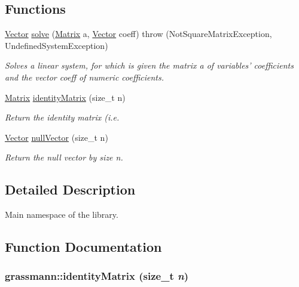 \subsection*{Functions}
\begin{CompactItemize}
\item 
\hyperlink{classgrassmann_1_1Vector}{Vector} \hyperlink{namespacegrassmann_bc7cc2e4f7133d5867c3eeb29c506f2b}{solve} (\hyperlink{classgrassmann_1_1Matrix}{Matrix} a, \hyperlink{classgrassmann_1_1Vector}{Vector} coeff)  throw (NotSquareMatrixException, UndefinedSystemException)
\begin{CompactList}\small\item\em Solves a linear system, for which is given the matrix a of variables' coefficients and the vector coeff of numeric coefficients. \item\end{CompactList}\item 
\hyperlink{classgrassmann_1_1Matrix}{Matrix} \hyperlink{namespacegrassmann_52c01a5f35814c18bdd1af4674378470}{identityMatrix} (size\_\-t n)
\begin{CompactList}\small\item\em Return the identity matrix (i.e. \item\end{CompactList}\item 
\hyperlink{classgrassmann_1_1Vector}{Vector} \hyperlink{namespacegrassmann_f05f7cfa12aaac77dbbd4bb494e74972}{nullVector} (size\_\-t n)
\begin{CompactList}\small\item\em Return the null vector by size n. \item\end{CompactList}\end{CompactItemize}


\subsection{Detailed Description}
Main namespace of the library. 

\subsection{Function Documentation}
\hypertarget{namespacegrassmann_52c01a5f35814c18bdd1af4674378470}{
\subsubsection[identityMatrix]{ grassmann::identityMatrix (size\_\-t {\em n})}}
\label{namespacegrassmann_52c01a5f35814c18bdd1af4674378470}


